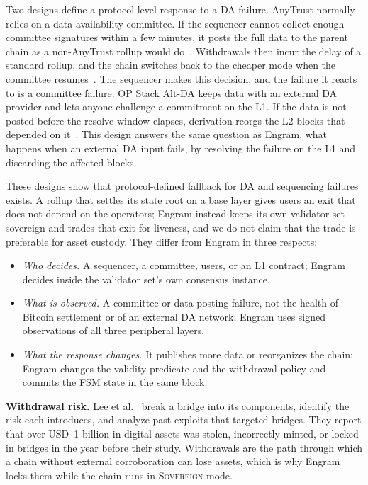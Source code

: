 Two designs define a protocol-level response to a DA failure. AnyTrust
normally relies on a data-availability committee. If the
sequencer cannot collect enough committee signatures within a few minutes, it
posts the full data to the parent chain as a non-AnyTrust rollup would
do~\cite{arbitrum_anytrust}. Withdrawals then incur the delay of a standard
rollup, and the chain switches back to the cheaper mode when the committee
resumes~\cite{arbitrum_orbit_anytrust}. The sequencer makes this decision, and the
failure it reacts to is a committee failure. OP Stack Alt-DA keeps data with an
external DA provider and lets anyone challenge a commitment on the L1. If the
data is not posted before the resolve window elapses, derivation reorgs the
L2 blocks that depended on it~\cite{optimism_altda}. This design answers the same
question as Engram, what happens when an external DA input fails, by
resolving the failure on the L1 and discarding the affected blocks.

These designs show that protocol-defined fallback for DA and sequencing
failures exists. A rollup that settles its state root on a base layer gives users an exit that does not depend on the operators; Engram instead keeps its own validator set sovereign and trades that exit for liveness, and we do not claim that the trade is preferable for asset custody. They differ from Engram in three respects:
\begin{itemize}
  \item \emph{Who decides.} A sequencer, a committee, users, or an L1 contract;
  Engram decides inside the validator set's own consensus instance.
  \item \emph{What is observed.} A committee or data-posting failure, not the
  health of Bitcoin settlement or of an external DA network; Engram uses signed
  observations of all three peripheral layers.
  \item \emph{What the response changes.} It publishes more data or
  reorganizes the chain; Engram changes the validity predicate and the
  withdrawal policy and commits the FSM state in the same block.
\end{itemize}

\textbf{Withdrawal risk.}
Lee et al.~\cite{lee2023bridges} break a bridge into its components, identify
the risk each introduces, and analyze past exploits that targeted bridges. They
report that over USD~1 billion in digital assets was stolen, incorrectly
minted, or locked in bridges in the year before their study. Withdrawals are the
path through which a chain without external corroboration can lose assets,
which is why Engram locks them while the chain runs in \textsc{Sovereign} mode.


